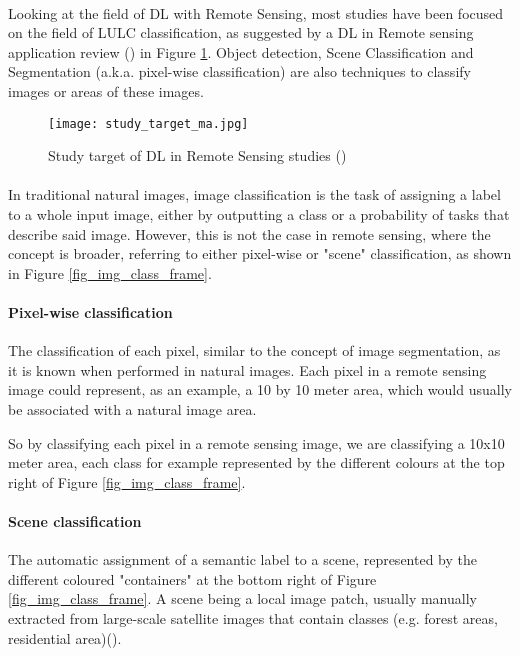 \paragraph{}
Looking at the field of \gls{DL} with Remote Sensing, most studies have been focused on the field of \gls{LULC} classification, as suggested by a \gls{DL} in Remote sensing application review (\cite{MA2019166}) in Figure \ref{fig_dl_studies}. Object detection, Scene Classification and Segmentation (\gls{a.k.a.} pixel-wise classification) are also techniques to classify images or areas of these images.

    \begin{figure}[hbt!]
        \centering
        \texttt{[image: study\_target\_ma.jpg]}
        \caption{Study target of \gls{DL} in Remote Sensing studies (\cite{MA2019166})}
        \label{fig_dl_studies}
    \end{figure}

\paragraph{}
In traditional natural images, image classification is the task of assigning a label to a whole input image, either by outputting a class or a probability of tasks that describe said image. However, this is not the case in remote sensing, where the concept is broader, referring to either pixel-wise or "scene" classification, as shown in Figure \ref{fig_img_class_frame}.

\paragraph{Pixel-wise classification} The classification of each pixel, similar to the concept of image segmentation, as it is known when performed in natural images. Each pixel in a remote sensing image could represent, as an example, a 10 by 10 meter area, which would usually be associated with a natural image area. 

So by classifying each pixel in a remote sensing image, we are classifying a 10x10 meter area, each class for example represented by the different colours at the top right of Figure \ref{fig_img_class_frame}. 

\paragraph{Scene classification} The automatic assignment of a semantic label to a scene, represented by the different coloured "containers" at the bottom right of Figure \ref{fig_img_class_frame}. A scene being a local image patch, usually manually extracted from large-scale satellite images that contain classes (e.g. forest areas, residential area)(\cite{https://doi.org/10.1002/widm.1264}).


